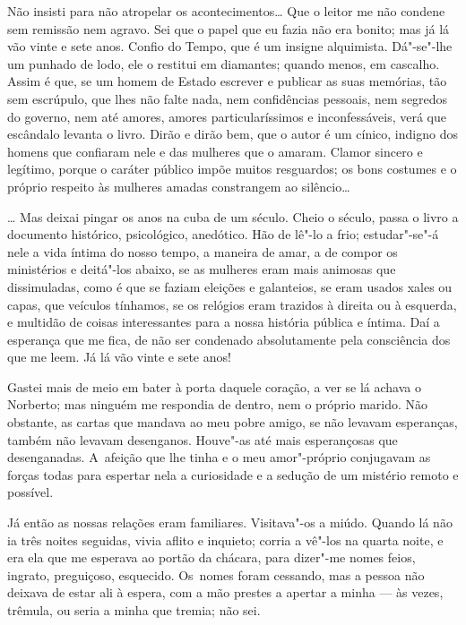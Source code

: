 \begin{linenumbers}
Não insisti para não atropelar os acontecimentos\ldots{} Que o leitor me não
condene sem remissão nem agravo. Sei que o papel que eu fazia não era
bonito; mas já lá vão vinte e sete anos. Confio do Tempo, que é um
insigne alquimista. Dá"-se"-lhe um punhado de lodo, ele o restitui em
diamantes; quando menos, em cascalho. Assim é que, se um homem de Estado
escrever e publicar as suas memórias, tão sem escrúpulo, que lhes não
falte nada, nem confidências pessoais, nem segredos do governo, nem até
amores, amores particularíssimos e inconfessáveis, verá que escândalo
levanta o livro. Dirão e dirão bem, que o autor é um cínico, indigno dos
homens que confiaram nele e das mulheres que o amaram. Clamor sincero e
legítimo, porque o caráter público impõe muitos resguardos; os bons
costumes e o próprio respeito às mulheres amadas constrangem ao
silêncio\ldots{}

\ldots{} Mas deixai pingar os anos na cuba de um século. Cheio o século,
passa o livro a documento histórico, psicológico, anedótico. Hão de
lê"-lo a frio; estudar"-se"-á nele a vida íntima do nosso tempo, a maneira
de amar, a de compor os ministérios e deitá"-los abaixo, se as mulheres
eram mais animosas que dissimuladas, como é que se faziam eleições e
galanteios, se eram usados xales ou capas, que veículos tínhamos, se os
relógios eram trazidos à direita ou à esquerda, e multidão de coisas
interessantes para a nossa história pública e íntima. Daí a esperança
que me fica, de não ser condenado absolutamente pela consciência dos que
me leem. Já lá vão vinte e sete anos!

Gastei mais de meio em bater à porta daquele coração, a ver se lá achava
o Norberto; mas ninguém me respondia de dentro, nem o próprio marido.
Não obstante, as cartas que mandava ao meu pobre amigo, se não levavam
esperanças, também não levavam desenganos. Houve"-as até mais
esperançosas que desenganadas. A~afeição que lhe tinha e o meu
amor"-próprio conjugavam as forças todas para espertar nela a curiosidade
e a sedução de um mistério remoto e possível.

Já então as nossas relações eram familiares. Visitava"-os a miúdo. Quando
lá não ia três noites seguidas, vivia aflito e inquieto; corria a vê"-los
na quarta noite, e era ela que me esperava ao portão da chácara, para
dizer"-me nomes feios, ingrato, preguiçoso, esquecido. Os~nomes foram
cessando, mas a pessoa não deixava de estar ali à espera, com a mão
prestes a apertar a minha --- às vezes, trêmula, ou seria a minha que
tremia; não sei.


\end{linenumbers}

